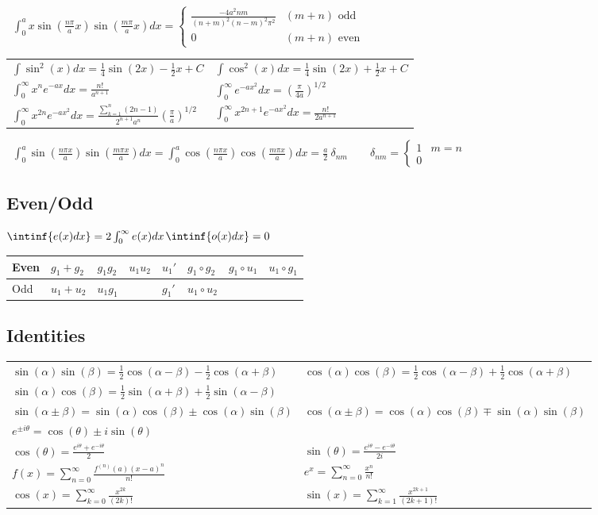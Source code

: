 \documentclass[10pt,a4paper]{scrartcl}
\begin{document}
\begin{multicols*}{2}
	$\;\;\int_0^a{x\sin(\frac{n\pi}{a}x)\sin(\frac{m\pi}{a}x)dx}=
	\begin{cases}
	\frac{-4a^2nm}{(n+m)^2(n-m)^2\pi^2} & (m+n) \text{ odd} \\
	0 & (m+n) \text{ even}
	\end{cases}	
	$
	
	\begin{tabular}{ll}
	$\int{\sin^2(x)dx}=\frac{1}{4}\sin(2x)-\frac{1}{2}x+C$&$\int{\cos^2(x)dx}=\frac{1}{4}\sin(2x)+\frac{1}{2}x+C$\\
	$\int_0^\infty{x^ne^{-ax}dx}=\frac{n!}{a^{n+1}}$&$\int_0^\infty{e^{-ax^2}dx}=(\frac{\pi}{4a})^{1/2}$\\
	$\int_0^\infty{x^{2n}e^{-ax^2}dx}=\frac{\sum_{k=1}^n{(2n-1)}}{2^{n+1}a^n}(\frac{\pi}{a})^{1/2}$&$\int_0^\infty{x^{2n+1}e^{-ax^2}dx}=\frac{n!}{2a^{n+1}}$
	\end{tabular}
	
	$\;\;\int_0^a{\sin(\frac{n\pi x}{a})\sin(\frac{m\pi x}{a})dx}=\int_0^a{\cos(\frac{n\pi x}{a})\cos(\frac{m\pi x}{a})dx}=\frac{a}{2}\ \delta_{nm}\qquad\delta_{nm}=\begin{cases}1&m=n\\0&\end{cases}$
	
	\subsection{Even/Odd}
	
	$\intinf{e(x)dx}=2\int_0^\infty{e(x)dx}$\hfill$\intinf{o(x)dx}=0$
	
	\begin{tabular}{l|lll|l|lll}
	Even&$g_1+g_2$&$g_1g_2$&$u_1u_2$&$u_1'$&$g_1\circ g_2$&$g_1\circ u_1$&$u_1\circ g_1$\\
	\hline
	Odd	&$u_1+u_2$&$u_1g_1$&&$g_1'$&$u_1\circ u_2$& &
	\end{tabular}	
	
	\subsection{Identities}
	
	\begin{tabular}{ll}
	$\sin(\alpha)\sin(\beta)=\frac{1}{2}\cos(\alpha-\beta)-\frac{1}{2}\cos(\alpha+\beta)$&$\cos(\alpha)\cos(\beta)=\frac{1}{2}\cos(\alpha-\beta)+\frac{1}{2}\cos(\alpha+\beta)$\\
	$\sin(\alpha)\cos(\beta)=\frac{1}{2}\sin(\alpha+\beta)+\frac{1}{2}\sin(\alpha-\beta)$&\\
	$\sin(\alpha\pm\beta)=\sin(\alpha)\cos(\beta)\pm\cos(\alpha)\sin(\beta)$&$\cos(\alpha\pm\beta)=\cos(\alpha)\cos(\beta)\mp\sin(\alpha)\sin(\beta)$\\
	$e^{\pm i\theta}=\cos(\theta)\pm i\sin(\theta)$&\\
	$\cos(\theta)=\frac{e^{i\theta}+e^{-i\theta}}{2}$&$\sin(\theta)=\frac{e^{i\theta}-e^{-i\theta}}{2i}$\\
	$f(x)=\sum_{n=0}^\infty{\frac{f^{(n)}(a)(x-a)^n}{n!}}$&$e^x=\sum_{n=0}^\infty{\frac{x^n}{n!}}$\\
	$\cos(x)=\sum_{k=0}^\infty{\frac{x^{2k}}{(2k)!}}$&$\sin(x)=\sum_{k=1}^\infty{\frac{x^{2k+1}}{(2k+1)!}}$
	

\end{tabular}
\end{multicols*}
\end{document}
